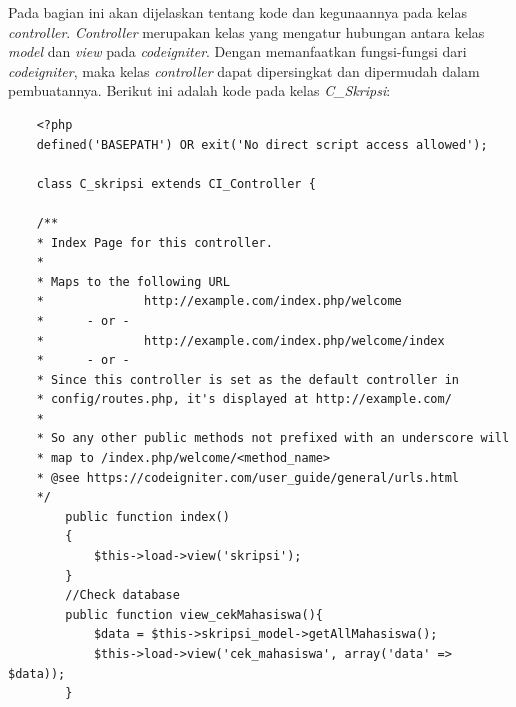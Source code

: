 	Pada bagian ini akan dijelaskan tentang kode dan kegunaannya pada kelas \textit{controller}. \textit{Controller} merupakan kelas yang mengatur hubungan antara kelas \textit{model} dan \textit{view} pada \textit{codeigniter}. Dengan memanfaatkan fungsi-fungsi dari \textit{codeigniter}, maka kelas \textit{controller} dapat dipersingkat dan dipermudah dalam pembuatannya. Berikut ini adalah kode pada kelas \textit{C\_Skripsi}:
\begin{lstlisting}
	<?php
	defined('BASEPATH') OR exit('No direct script access allowed');
	
	class C_skripsi extends CI_Controller {
	
	/**
	* Index Page for this controller.
	*
	* Maps to the following URL
	*              http://example.com/index.php/welcome
	*      - or -
	*              http://example.com/index.php/welcome/index
	*      - or -
	* Since this controller is set as the default controller in
	* config/routes.php, it's displayed at http://example.com/
	*
	* So any other public methods not prefixed with an underscore will
	* map to /index.php/welcome/<method_name>
	* @see https://codeigniter.com/user_guide/general/urls.html
	*/
		public function index()
		{
			$this->load->view('skripsi');
		}
		//Check database
		public function view_cekMahasiswa(){
			$data = $this->skripsi_model->getAllMahasiswa();
			$this->load->view('cek_mahasiswa', array('data' => $data));
		}
		

\end{lstlisting}
